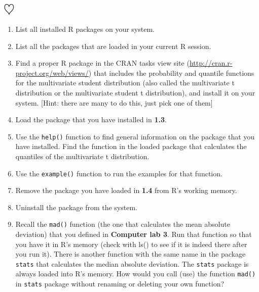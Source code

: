 \documentclass[a4paper]{article}
\begin{document}
\section{$\heartsuit$}
\begin{enumerate}
\item List all installed R packages on your system.

\item List all the packages that are loaded in your current R session.

\item Find a proper R package in the CRAN tasks view site
  (\url{http://cran.r-project.org/web/views/}) that includes the probability
  and quantile functions for the multivariate student distribution (also called the
  multivariate t distribution or the multivariate student t distribution), and install it on
  your system. [Hint: there are many to do this, just pick one of them]

\item Load the package that you have installed in \textbf{1.3}.

\item Use the \texttt{help()} function to find general information on the
  package that you have installed. Find the function in the loaded package that calculates the quantiles of the multivariate t distribution.
 
\item Use the \texttt{example()} function to run the examples for that
  function.

\item Remove the package you have loaded in \textbf{1.4} from R's working memory.

\item Uninstall the package from the system.

\item Recall the \texttt{mad()} function (the one that calculates the mean
  absolute deviation) that you defined in \textbf{Computer lab 3}. Run that function so
  that you have it in R's memory (check with ls() to see if it is indeed there after you
  run it). There is another function with the same name in the package \texttt{stats} that calculates the median
  absolute deviation. The \texttt{stats} package is always loaded into R's memory. How
  would you call (use) the function \texttt{mad()} in
  \texttt{stats} package without renaming or deleting your own function?

\end{enumerate}
\end{document}
